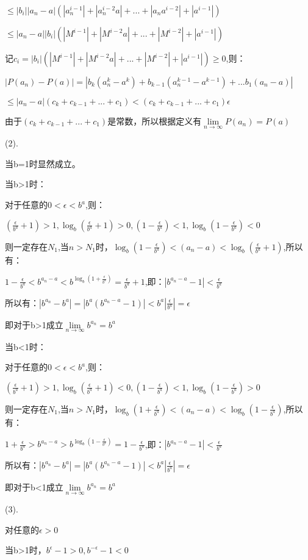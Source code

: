 \documentclass[12pt]{ctexart}
\begin{document}
$\le|b_i||a_n-a|(|a_n^{i-1}|+|a_n^{i-2}a|+...+|a_na^{i-2}|+|a^{i-1}|)$

$\le|a_n-a||b_i|(|M^{i-1}|+|M^{i-2}a|+...+|M^{i-2}|+|a^{i-1}|)$

记$c_i=|b_i|(|M^{i-1}|+|M^{i-2}a|+...+|M^{i-2}|+|a^{i-1}|)\ge0$,则：

$|P(a_n)-P(a)|=|b_k(a_n^k-a^k)+b_{k-1}(a_n^{k-1}-a^{k-1})+...b_1(a_n-a)|$

$\le|a_n-a|(c_k+c_{k-1}+...+c_1)<(c_k+c_{k-1}+...+c_1)\epsilon$

由于$(c_k+c_{k-1}+...+c_1)$是常数，所以根据定义有$\lim\limits_{n\to\infty}P(a_n)=P(a)$

(2).

当b=1时显然成立。

当b>1时：

对于任意的$0<\epsilon<b^a$,则：

$(\frac{\epsilon}{b^a}+1)>1,\log_b{(\frac{\epsilon}{b^a}+1)}>0, (1-\frac{\epsilon}{b^a})<1,\log_b{(1-\frac{\epsilon}{b^a})}<0$

则一定存在$N_1$,当$n>N_1$时，$\log_b{(1-\frac{\epsilon}{b^a})}<(a_n-a)<\log_b{(\frac{\epsilon}{b^a}+1)}$,所以有：

$1-\frac{\epsilon}{b^a}<b^{a_n-a}<b^{\log_b{(1+\frac{\epsilon}{b^a})}}=\frac{\epsilon}{b^a}+1$,即：$|b^{a_n-a}-1|<\frac{\epsilon}{b^a}$

所以有：$|b^{a_n}-b^a|=|b^a(b^{a_n-a}-1)|<b^a|\frac{\epsilon}{b^a}|=\epsilon$

即对于b>1成立$\lim\limits_{n\to\infty}b^{a_n}=b^a$

当b<1时：

对于任意的$0<\epsilon<b^a$,则：

$(\frac{\epsilon}{b^a}+1)>1,\log_b{(\frac{\epsilon}{b^a}+1)}<0, (1-\frac{\epsilon}{b^a})<1,\log_b{(1-\frac{\epsilon}{b^a})}>0$

则一定存在$N_1$,当$n>N_1$时，$\log_b{(1+\frac{\epsilon}{b^a})}<(a_n-a)<\log_b{(1-\frac{\epsilon}{b^a})}$,所以有：

$1+\frac{\epsilon}{b^a}>b^{a_n-a}>b^{\log_b{(1-\frac{\epsilon}{b^a})}}=1-\frac{\epsilon}{b^a}$,即：$|b^{a_n-a}-1|<\frac{\epsilon}{b^a}$

所以有：$|b^{a_n}-b^a|=|b^a(b^{a_n-a}-1)|<b^a|\frac{\epsilon}{b^a}|=\epsilon$

即对于b<1成立$\lim\limits_{n\to\infty}b^{a_n}=b^a$

(3).

对任意的$\epsilon>0$

当b>1时，$b^{\epsilon}-1>0,b^{-\epsilon}-1<0$
\end{document}
